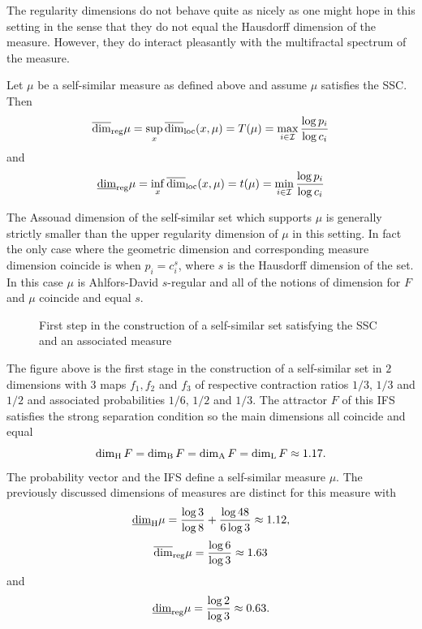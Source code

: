 The regularity dimensions do not behave quite as nicely as one might hope in this setting in the sense that they do not equal the Hausdorff dimension of the measure. However, they do interact pleasantly with the multifractal spectrum of the measure.  

\begin{theorem}\label{ch-upper-reg:selfsimilar}
	Let $\mu$ be a self-similar measure as defined above and assume $\mu$ satisfies the SSC.  Then 
	\[
	\overline{\dim}_{\textup{reg}} \mu = \sup_x \overline{\dim}_{\textup{loc}}(x,\mu) = T(\mu) = \max_{i \in \mathcal{I}} \frac{\log p_i}{\log c_i}
	\]
	and 
	\[
	\underline{\dim}_{\textup{reg}} \mu = \inf_x \overline{\dim}_{\textup{loc}}(x,\mu) = t(\mu) = \min_{i \in \mathcal{I}} \frac{\log p_i}{\log c_i}
	\]
\end{theorem}

The Assouad dimension of the self-similar set which supports $\mu$ is generally strictly smaller than the upper regularity dimension of $\mu$ in this setting.  In fact the only case where the geometric dimension and corresponding measure dimension coincide is when  $p_i=c_i^s$, where $s$ is the Hausdorff dimension of the set. In this case $\mu$ is Ahlfors-David $s$-regular and all of the notions of dimension for $F$ and $\mu$ coincide and equal $s$.

\begin{figure}[htb]
    \centering
    \caption{First step in the construction of a self-similar set satisfying the SSC and an associated measure}
    \label{fig:ex-self-sim}
\end{figure}



The figure above is the first stage in the construction of a self-similar set in $2$ dimensions with 3 maps $f_1, f_2$ and $f_3$ of respective contraction ratios $1/3$, $1/3$ and $1/2$ and associated probabilities $1/6$, $1/2$ and $1/3$. The attractor $F$ of this IFS satisfies the strong separation condition so the main dimensions all coincide and equal
\[
\dim_{\text{H}} F = \dim_\textup{B} F = \dim_{\textup{A}} F = \dim_{\textup{L}} F \approx 1.17.
\]
The probability vector and the IFS define a self-similar measure $\mu$. The previously discussed dimensions of measures are distinct for this measure with
\[
\underline{\dim}_{\text{H}} \mu = \frac{\log 3}{\log 8} + \frac{\log 48}{6\log 3 } \approx 1.12,
\]
\[
\overline{\dim}_{\textup{reg}} \mu = \frac{\log 6}{\log 3} \approx 1.63
\]
and 
\[
\underline{\dim}_{\textup{reg}} \mu = \frac{\log 2}{\log 3} \approx 0.63.
\]








